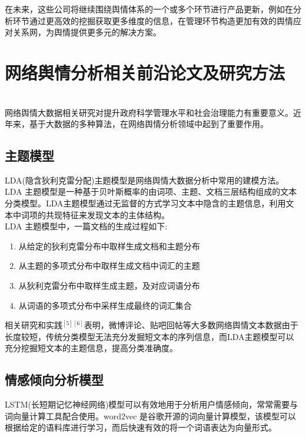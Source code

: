 \documentclass[11pt,a4paper,utf8]{article}
\begin{document}
在未来，这些公司将继续围绕舆情体系的一个或多个环节进行产品更新，例如在分析环节通过更高效的挖掘获取更多维度的信息，在管理环节构造更加有效的舆情应对关系网，为舆情提供更多元的解决方案。 \\

\section{网络舆情分析相关前沿论文及研究方法}

{\color{red}{以下部分由周浩然书写整理}} \\
网络舆情大数据相关研究对提升政府科学管理水平和社会治理能力有重要意义。近年来，基于大数据的多种算法，在网络舆情分析领域中起到了重要作用。\\

\subsection{主题模型}

LDA(隐含狄利克雷分配)主题模型是网络舆情大数据分析中常用的建模方法。\\

LDA 主题模型是一种基于贝叶斯概率的由词项、主题、文档三层结构组成的文本分类模型。LDA主题模型通过无监督的方式学习文本中隐含的主题信息，利用文本中词项的共现特征来发现文本的主体结构。 \\ 

LDA 主题模型中，一篇文档的生成过程如下: 
\begin{enumerate}
\item 从给定的狄利克雷分布中取样生成文档和主题分布
\item 从主题的多项式分布中取样生成文档中词汇的主题
\item 从狄利克雷分布中取样生成主题，及对应词语分布
\item 从词语的多项式分布中采样生成最终的词汇集合
\end{enumerate}
 

相关研究和实践$^{[5][6]}$表明，微博评论、贴吧回帖等大多数网络舆情文本数据由于长度较短，传统分类模型无法充分发掘短文本的序列信息，而LDA主题模型可以充分挖掘短文本的主题信息，提高分类准确度。

\subsection{情感倾向分析模型}
LSTM(长短期记忆神经网络)模型可以有效地用于分析用户情感倾向，常常需要与词向量计算工具配合使用。word2vec 是谷歌开源的词向量计算模型，该模型可以根据给定的语料库进行学习，而后快速有效的将一个词语表达为向量形式。 \\
\end{document}
